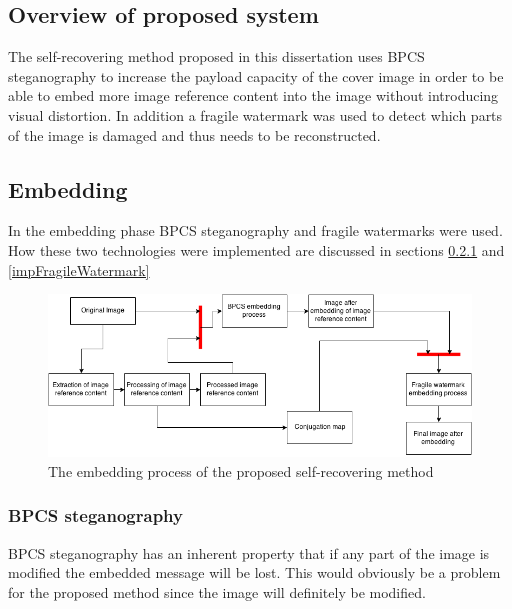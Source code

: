 \documentclass[12pt]{article}
\begin{document}
\subsection{Overview of proposed system}
\label{impOverview}
The self-recovering method proposed in this dissertation uses BPCS steganography to increase the payload capacity of the cover image in order to be able to embed more image reference content into the image without introducing visual distortion.
In addition a fragile watermark was used to detect which parts of the image is damaged and thus needs to be reconstructed.

\subsection{Embedding}
\label{embedding}
In the embedding phase BPCS steganography and fragile watermarks were used.  How these two technologies were implemented are discussed in sections \ref{bpcsSteg} and \ref{impFragileWatermark}

\begin{figure}[h]
\centerline{%
\includegraphics[scale=0.6]{"EmbeddingProcess"}%
} %
\caption{The embedding process of the proposed self-recovering method}
\label{fig:embeddingProcess}
\end{figure}

\subsubsection{BPCS steganography} 
\label{bpcsSteg}

BPCS steganography has an inherent property that if any part of the image is modified the embedded message will be lost.
This would obviously be a problem for the proposed method since the image will definitely be modified.
\end{document}
